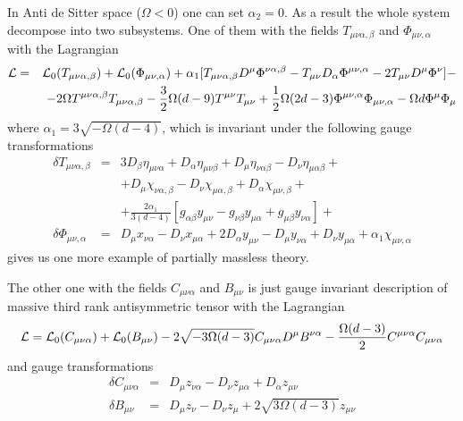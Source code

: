 \documentclass[a4paper,12pt]{article}
\begin{document}
In Anti de Sitter space ($\Omega < 0$) one can set $\alpha_2 = 0$.
As a result the whole system decompose into two subsystems. One of
them with the fields $T_{\mu\nu\alpha,\beta}$ and $\Phi_{\mu\nu,\alpha}$
with the Lagrangian
\begin{eqnarray}
{\cal L} &=& {\cal L}_0 (T_{\mu\nu\alpha,\beta}) + {\cal L}_0
(\Phi_{\mu\nu,\alpha}) + \alpha_1 [ T_{\mu\nu\alpha,\beta} D^\mu
\Phi^{\nu\alpha,\beta} - T_{\mu\nu} D_\alpha \Phi^{\mu\nu,\alpha}
- 2 T_{\mu\nu} D^\mu \Phi^\nu ] - \nonumber \\
 && - 2 \Omega T^{\mu\nu\alpha,\beta} T_{\mu\nu\alpha,\beta} -
 \frac{3}{2} \Omega (d-9) T^{\mu\nu} T_{\mu\nu} + \frac{1}{2}
 \Omega (2d-3) \Phi^{\mu\nu,\alpha} \Phi_{\mu\nu,\alpha} -
 \Omega d \Phi^\mu \Phi_\mu
\end{eqnarray}
where $\alpha_1 = 3\sqrt{-\Omega(d-4)}$, which is invariant under
the following gauge transformations
\begin{eqnarray}
\delta T_{\mu\nu\alpha,\beta} &=& 3 D_\beta \eta_{\mu\nu\alpha}
+ D_\alpha \eta_{\mu\nu\beta} + D_\mu \eta_{\nu\alpha\beta}
- D_\nu \eta_{\mu\alpha\beta} + \nonumber \\
 && + D_\mu \chi_{\nu\alpha,\beta} - D_\nu
\chi_{\mu\alpha,\beta} + D_\alpha \chi_{\mu\nu,\beta} + \nonumber \\
 && + \frac{2 \alpha_1}{3(d-4)} [ g_{\alpha\beta} y_{\mu\nu}
 - g_{\nu\beta} y_{\mu\alpha} + g_{\mu\beta} y_{\nu\alpha} ] + \nonumber \\
\delta \Phi_{\mu\nu,\alpha} &=& D_\mu x_{\nu\alpha} - D_\nu
x_{\mu\alpha} + 2 D_\alpha y_{\mu\nu} - D_\mu y_{\nu\alpha}
+ D_\nu y_{\mu\alpha} + \alpha_1 \chi_{\mu\nu,\alpha}
\end{eqnarray}
gives us one more example of partially massless theory.

The other one with the fields $C_{\mu\nu\alpha}$ and $B_{\mu\nu}$ is
just gauge invariant description of massive third rank antisymmetric
tensor with the Lagrangian
\begin{equation}
{\cal L} = {\cal L}_0 (C_{\mu\nu\alpha}) + {\cal L}_0 (B_{\mu\nu}) - 2
\sqrt{- 3 \Omega (d-3)} C_{\mu\nu\alpha} D^\mu B^{\nu\alpha} -
\frac{\Omega (d-3)}{2} C^{\mu\nu\alpha} C_{\mu\nu\alpha}
\end{equation}
and gauge transformations
\begin{eqnarray}
\delta C_{\mu\nu\alpha} &=& D_\mu z_{\nu\alpha} - D_\nu z_{\mu\alpha}
+ D_\alpha z_{\mu\nu} \nonumber \\
\delta B_{\mu\nu} &=& D_\mu z_\nu - D_\nu z_\mu + 2 \sqrt{ 3 \Omega (d-3)}
z_{\mu\nu}
\end{eqnarray}
\end{document}
